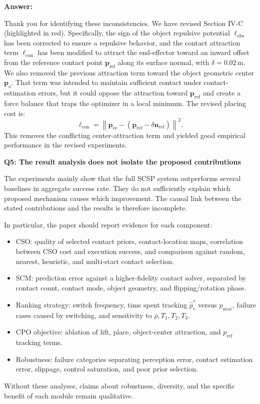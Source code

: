\documentclass[journal,10pt]{IEEEtran}
\newcommand{\question}[2]{\par\smallskip\noindent
 \color{responseblue}\textbf{Q#1: #2}\par\nobreak\noindent\color{responseblue}}
\newcommand{\answer}{\par\smallskip\noindent\color{black}\textbf{Answer: }\ignorespaces
}
\begin{document}
\answer
Thank you for identifying these inconsistencies. We have revised Section IV-C (highlighted in red). Specifically, the sign of the object repulsive potential $\ell_{\mathrm{obs}}$ has been corrected to ensure a repulsive behavior, and the contact attraction term $\ell_{\mathrm{con}}$ has been modified to attract the end-effector toward an inward offset from the reference contact point $\boldsymbol{p}_{\mathrm{ref}}$ along its surface normal, with $\delta=0.02\,\mathrm{m}$. We also removed the previous attraction term toward the object geometric center $\boldsymbol{p}_o$. That term was intended to maintain sufficient contact under contact-estimation errors, but it could oppose the attraction toward $\boldsymbol{p}_{\mathrm{ref}}$ and create a force balance that traps the optimizer in a local minimum. The revised placing cost is:
\begingroup
\begin{equation}
\ell_{\mathrm{con}}=\left\|\boldsymbol{p}_{\mathrm{ee}}-\left(\boldsymbol{p}_{\mathrm{ref}}-\delta\boldsymbol{n}_{\mathrm{ref}}\right)\right\|^2.
\label{eq:placing_cost_reply}
\end{equation}
\endgroup
This removes the conflicting center-attraction term and yielded good empirical performance in the revised experiments.

\question{5}{The result analysis does not isolate the proposed contributions}

The experiments mainly show that the full SCSP system outperforms several baselines in aggregate success rate. They do not sufficiently explain which proposed mechanism causes which improvement. The causal link between the stated contributions and the results is therefore incomplete.

In particular, the paper should report evidence for each component:
\begin{itemize}
 \item CSO: quality of selected contact priors, contact-location maps, correlation between CSO cost and execution success, and comparison against random, nearest, heuristic, and multi-start contact selection.
 \item SCM: prediction error against a higher-fidelity contact solver, separated by contact count, contact mode, object geometry, and flipping/rotation phase.
 \item Ranking strategy: switch frequency, time spent tracking $\hat{p}_r^*$ versus $p_{\text{near}}$, failure cases caused by switching, and sensitivity to $\bar{\rho},T_1,T_2,T_3$.
 \item CPO objective: ablation of lift, place, object-center attraction, and $p_{\text{ref}}$ tracking terms.
 \item Robustness: failure categories separating perception error, contact estimation error, slippage, control saturation, and poor prior selection.
\end{itemize}
Without these analyses, claims about robustness, diversity, and the specific benefit of each module remain qualitative.
\end{document}
